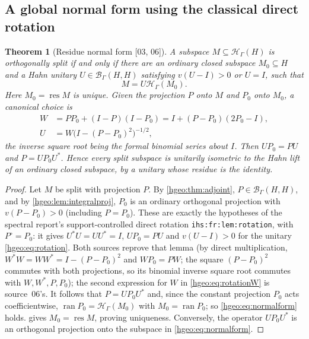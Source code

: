 \documentclass[11pt,letterpaper]{article}
\numberwithin{equation}{section}
\newtheorem{theorem}{Theorem}[section]
\theoremstyle{definition}
\theoremstyle{remark}
\newcommand{\HH}[1]{\mathscr H_\Gamma(#1)}
\newcommand{\BH}{\mathscr B_\Gamma(H,H)}
\newcommand{\ran}{\operatorname{ran}}
\newcommand{\res}{\operatorname{res}}
\newcommand{\src}[1]{\textup{\textsf{\small[#1]}}}
\newcommand{\replabel}[1]{\nolinkurl{#1}}
\begin{document}
\subsection{A global normal form using the classical direct rotation}

\begin{theorem}[Residue normal form \src{03, 06}]\label{hgeo:thm:normalform}
A subspace $M\subseteq\HH{H}$ is orthogonally split if and only if
there are an ordinary closed subspace $M_0\subseteq H$ and a Hahn
unitary $U\in\BH$ satisfying $v(U-I)>0$ or $U=I$, such that
\begin{equation}\label{hgeo:eq:normalform}
 M=U\HH{M_0}.
\end{equation}
Here $M_0=\res M$ is unique. Given the projection $P$ onto $M$ and
$P_0$ onto $M_0$, a canonical choice is
\begin{align}
 W&=PP_0+(I-P)(I-P_0)=I+(P-P_0)(2P_0-I),\label{hgeo:eq:rotationW}\\
 U&=W\bigl(I-(P-P_0)^2\bigr)^{-1/2},\label{hgeo:eq:rotation}
\end{align}
the inverse square root being the formal binomial series about $I$. Then
$UP_0=PU$ and $P=UP_0U^*$. Hence every split subspace is unitarily
isometric to the Hahn lift of an ordinary closed subspace, by a unitary whose
residue is the identity.
\end{theorem}
\begin{proof}
Let $M$ be split with projection $P$. By \cref{hgeo:thm:adjoint}, $P\in\BH$,
and by \cref{hgeo:lem:integralproj}, $P_0$ is an ordinary orthogonal
projection with $v(P-P_0)>0$ (including $P=P_0$). These are exactly the
hypotheses of the spectral report's support-controlled direct rotation
\replabel{ihs:fr:lem:rotation}, with $P^\circ=P_0$: it gives
$U^*U=UU^*=I$, $UP_0=PU$ and $v(U-I)>0$ for the unitary
\eqref{hgeo:eq:rotation}. Both sources reprove that lemma (by direct
multiplication, $W^*W=WW^*=I-(P-P_0)^2$ and $WP_0=PW$; the square
$(P-P_0)^2$ commutes with both projections, so its binomial inverse square
root commutes with $W,W^*,P,P_0$); the second expression for $W$ in
\eqref{hgeo:eq:rotationW} is source~06's. It follows that $P=UP_0U^*$ and,
since the constant projection $P_0$ acts coefficientwise,
$\ran P_0=\HH{M_0}$ with $M_0=\ran P_0$; so \eqref{hgeo:eq:normalform} holds.
 gives $M_0=\res M$, proving uniqueness. Conversely,
the operator $UP_0U^*$ is an orthogonal projection onto the subspace in
\eqref{hgeo:eq:normalform}.
\end{proof}
\end{document}
